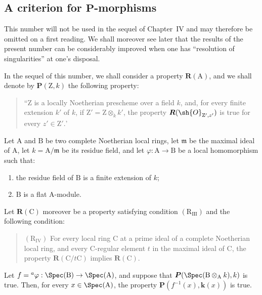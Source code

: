 \subsection{A criterion for \texorpdfstring{$\boldsymbol{P}$}{P}-morphisms}
\label{subsection:IV.7.5}

\begin{env}[7.5.0]
\label{IV.7.5.0}
This number will not be used in the sequel of Chapter~IV and may therefore be omitted on a first reading. We shall moreover see later  that the results of the present number can be considerably improved when one has ``resolution of singularities'' at one's disposal.

In the sequel of this number, we shall consider a property $\boldsymbol{R}(\mathrm{A})$, and we shall denote by $\boldsymbol{P}(\mathrm{Z},k)$ the following property:
\begin{quote}
``$\mathrm{Z}$ is a locally Noetherian prescheme over a field $k$, and, for every finite extension $k'$ of $k$, if $\mathrm{Z}'=\mathrm{Z}\otimes_k k'$, the property $\boldsymbol{R}(\sh{O}_{\mathrm{Z}',z'})$ is true for every $z'\in\mathrm{Z}'.$'
\end{quote}
\end{env}

\begin{theorem}[7.5.1]
\label{IV.7.5.1}
Let $\mathrm{A}$ and $\mathrm{B}$ be two complete Noetherian local rings, let $\mathfrak{m}$ be the maximal ideal of $\mathrm{A}$, let $k=\mathrm{A}/\mathfrak{m}$ be its residue field, and let $\varphi:\mathrm{A}\to\mathrm{B}$ be a local homomorphism such that:
\begin{enumerate}[label=(\roman*)]
  \item the residue field of $\mathrm{B}$ is a finite extension of $k$;
  \item $\mathrm{B}$ is a flat $\mathrm{A}$-module.
\end{enumerate}
Let $\boldsymbol{R}(\mathrm{C})$ moreover be a property satisfying condition $(\mathrm{R}_{\mathrm{III}})$  and the following condition:
\begin{quote}
$(\mathrm{R}_{\mathrm{IV}})$ For every local ring $\mathrm{C}$ at a prime ideal of a complete Noetherian local ring, and every $\mathrm{C}$-regular element $t$ in the maximal ideal of $\mathrm{C}$, the property $\boldsymbol{R}(\mathrm{C}/t\mathrm{C})$ implies $\boldsymbol{R}(\mathrm{C})$.
\end{quote}
Let $f={}^a\varphi:\Spec(\mathrm{B})\to\Spec(\mathrm{A})$, and suppose that $\boldsymbol{P}(\Spec(\mathrm{B}\otimes_\mathrm{A}k),k)$ is true. Then, for every $x\in\Spec(\mathrm{A})$, the property $\boldsymbol{P}(f^{-1}(x),\boldsymbol{k}(x))$ is true.
\end{theorem}

